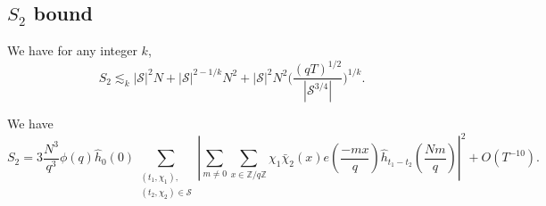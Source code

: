 \subsection{$S_2$ bound}
\begin{proposition}\label{s2bound}
    We have for any integer $k$,
    \[
    S_2\lesssim_k |\mathcal{S}|^2N+|\mathcal{S}|^{2-1/k}N^2+|\mathcal{S}|^2N^2\Big(\frac{(qT)^{1/2}}{|\mathcal{S}^{3/4}|}\Big)^{1/k}.
    \]
\end{proposition}

\begin{lemma}
    We have 
    \[
    S_2 = 3\frac{N^3}{q^3} \phi(q) \hat{h}_{0}\left(0\right) \sum_{\substack{(t_1,\chi_1),\\(t_2,\chi_2)\in\mathcal{S}}} \left|\sum_{m\neq 0} \sum_{x \in \mathbb{Z}/q\mathbb{Z}}\chi_1\bar{\chi}_2(x) e\left(\frac{-mx}{q}\right)
     \hat{h}_{t_1-t_2}\left(\frac{Nm}{q}\right)\right|^2 + O(T^{-10}).
\]
\end{lemma}
